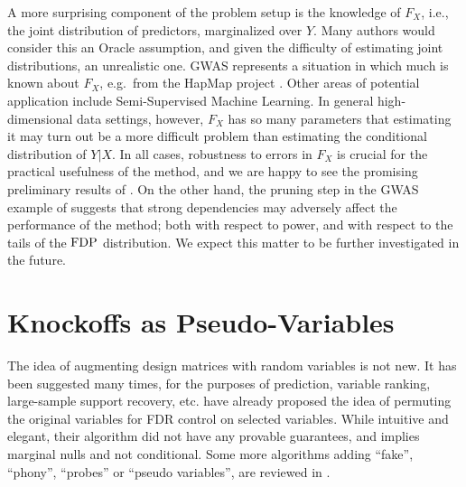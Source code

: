 \documentclass[article,lineno]{biometrika}
\begin{document}
	A more surprising component of the problem setup is the knowledge of $F_X$, i.e., the joint distribution of predictors, marginalized over $Y$.
	Many authors would consider this an Oracle assumption, and given the difficulty of estimating joint distributions, an unrealistic one.
	GWAS represents a situation in which much is known about $F_X$, e.g.\ from the HapMap project \citep{Hapmap2003}.
	Other areas of potential application include Semi-Supervised Machine Learning.
	In general high-dimensional data settings, however, $F_X$ has so many parameters that estimating it may turn out be a more difficult problem than estimating the conditional distribution of $Y|X$.
	In all cases, robustness to errors in $F_X$ is crucial for the practical usefulness of the method, and we are happy to see the promising preliminary results of \cite{CandesPanninggoldmodelX2018}.
	On the other hand, the pruning step in the GWAS example of \cite{SesiaGenehuntinghidden} suggests that strong dependencies may adversely affect the performance of the method; both with respect to power, and with respect to the tails of the $\rm{FDP}$ distribution.
	We expect this matter to be further investigated in the future.
	
	
	
	
	\section{Knockoffs as Pseudo-Variables}
	The idea of augmenting design matrices with random variables is not new.
	It has been suggested many times, for the purposes of prediction, variable ranking, large-sample support recovery, etc.
	\cite{TusherSignificanceanalysismicroarrays2001} have already proposed the idea of permuting the original variables for \rm{FDR} control on selected variables.
	While intuitive and elegant, their algorithm did not have any provable guarantees, and implies marginal nulls and not conditional.
	Some more algorithms adding ``fake'', ``phony'', ``probes'' or ``pseudo variables'', are reviewed in \cite{GuyonIntroductionVariableFeature2003}.
	
\end{document}
